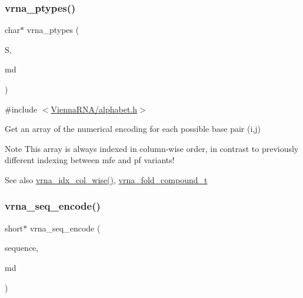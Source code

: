 \subsubsection{\texorpdfstring{vrna\+\_\+ptypes()}{vrna\_ptypes()}}
{\footnotesize\ttfamily char$\ast$ vrna\+\_\+ptypes (\begin{DoxyParamCaption}\item[{const short $\ast$}]{S,  }\item[{\mbox{\hyperlink{group__model__details_ga1f8a10e12a0a1915f2a4eff0b28ea17c}{vrna\+\_\+md\+\_\+t}} $\ast$}]{md }\end{DoxyParamCaption})}



{\ttfamily \#include $<$\mbox{\hyperlink{alphabet_8h}{Vienna\+R\+N\+A/alphabet.\+h}}$>$}



Get an array of the numerical encoding for each possible base pair (i,j) 

\begin{DoxyNote}{Note}
This array is always indexed in column-\/wise order, in contrast to previously different indexing between mfe and pf variants!
\end{DoxyNote}
\begin{DoxySeeAlso}{See also}
\mbox{\hyperlink{group__utils_ga89ebc69c52fa0c78c9e1974b0017746b}{vrna\+\_\+idx\+\_\+col\+\_\+wise()}}, \mbox{\hyperlink{group__fold__compound_ga1b0cef17fd40466cef5968eaeeff6166}{vrna\+\_\+fold\+\_\+compound\+\_\+t}} 
\end{DoxySeeAlso}
\mbox{\label{group__utils_ga636e7d6f888fd639587296a5eddea660}} 
\subsubsection{\texorpdfstring{vrna\+\_\+seq\+\_\+encode()}{vrna\_seq\_encode()}}
{\footnotesize\ttfamily short$\ast$ vrna\+\_\+seq\+\_\+encode (\begin{DoxyParamCaption}\item[{const char $\ast$}]{sequence,  }\item[{\mbox{\hyperlink{group__model__details_ga1f8a10e12a0a1915f2a4eff0b28ea17c}{vrna\+\_\+md\+\_\+t}} $\ast$}]{md }\end{DoxyParamCaption})}



